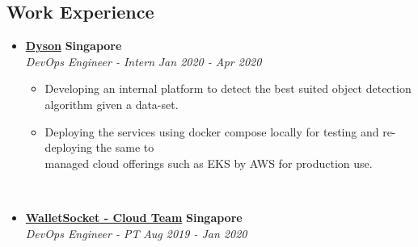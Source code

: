 \documentclass[11pt,a4paper]{article}
\begin{document}
\subsection*{Work Experience}
  \begin{itemize}
    \parskip=-0.5em


    
    \item[]
    {\href{https://www.dyson.com.sg/}{\textbf{Dyson}} \hfill
      \textbf{Singapore}}
    \\
    {\emph{DevOps Engineer - Intern} \hfill \emph{Jan 2020 - Apr 2020}}

    \begin{itemize}[label=\textbullet]
      \itemsep0em
      \item Developing an internal platform to detect the best suited object detection algorithm given a data-set.
      \item Deploying the services using docker compose locally for testing and re-deploying the same to \\ managed cloud offerings such as EKS by AWS for production use.
    \end{itemize}
    \ \
    \item[]
    {\href{https://www.walletsocket.com/}{\textbf{WalletSocket - Cloud Team}} \hfill
      \textbf{Singapore}}
    \\
    {\emph{DevOps Engineer - PT} \hfill \emph{Aug 2019 - Jan 2020}}


\end{itemize}
\end{document}
